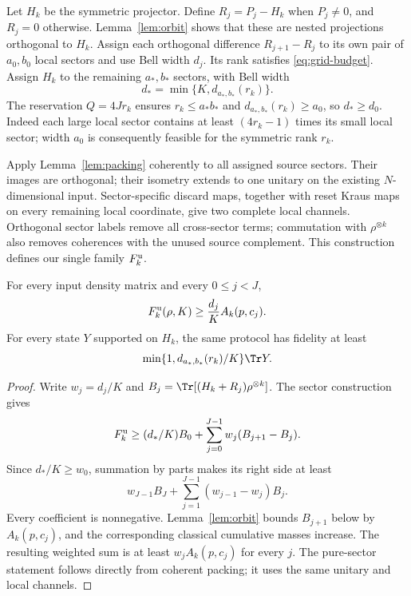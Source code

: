 Let $H_k$ be the symmetric projector. Define $R_j=P_j-H_k$ when $P_j\ne0$, and $R_j=0$ otherwise. Lemma~\ref{lem:orbit} shows that these are nested projections orthogonal to $H_k$. Assign each orthogonal difference $R_{j+1}-R_j$ to its own pair of $a_0,b_0$ local sectors and use Bell width $d_j$. Its rank satisfies \eqref{eq:grid-budget}. Assign $H_k$ to the remaining $a_*,b_*$ sectors, with Bell width
\[
 d_* = \min\{K,d_{a_*,b_*}(r_k)\}.
\]
The reservation $Q=4Jr_k$ ensures $r_k\le a_*b_*$ and $d_{a_*,b_*}(r_k)\ge a_0$, so $d_*\ge d_0$. Indeed each large local sector contains at least $(4r_k-1)$ times its small local sector; width $a_0$ is consequently feasible for the symmetric rank $r_k$.

Apply Lemma~\ref{lem:packing} coherently to all assigned source sectors. Their images are orthogonal; their isometry extends to one unitary on the existing $N$-dimensional input. Sector-specific discard maps, together with reset Kraus maps on every remaining local coordinate, give two complete local channels. Orthogonal sector labels remove all cross-sector terms; commutation with $\rho^{\otimes k}$ also removes coherences with the unused source complement. This construction defines our single family $F_k^{\rm u}$.

\begin{proposition}\label{prop:prefix}
For every input density matrix and every $0\le j<J$,
\begin{equation}\label{eq:good-mass}
 F_k^{\rm u}(\rho,K)\ge\frac{d_j}K A_k(p,c_j).
\end{equation}
For every state $Y$ supported on $H_k$, the same protocol has fidelity at least
\[
 \min\{1,d_{a_*,b_*}(r_k)/K\}\Tr Y.
\]
\end{proposition}
\begin{proof}
Write $w_j=d_j/K$ and $B_j=\Tr[(H_k+R_j)\rho^{\otimes k}]$. The sector construction gives
\[
 F_k^{\rm u}\ge(d_*/K)B_0+\sum_{j=0}^{J-1}w_j(B_{j+1}-B_j).
\]
Since $d_*/K\ge w_0$, summation by parts makes its right side at least
\[
 w_{J-1}B_J+\sum_{j=1}^{J-1}(w_{j-1}-w_j)B_j.
\]
Every coefficient is nonnegative. Lemma~\ref{lem:orbit} bounds $B_{j+1}$ below by $A_k(p,c_j)$, and the corresponding classical cumulative masses increase. The resulting weighted sum is at least $w_jA_k(p,c_j)$ for every $j$. The pure-sector statement follows directly from coherent packing; it uses the same unitary and local channels.
\end{proof}

